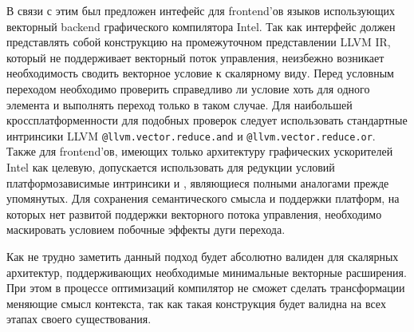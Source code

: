 В связи с этим был предложен интефейс для frontend'ов языков использующих
векторный backend графического компилятора Intel. Так как интерфейс должен
представлять собой конструкцию на промежуточном
представлении LLVM IR, который не поддерживает векторный поток управления,
неизбежно возникает необходимость сводить векторное условие к скалярному виду.
Перед условным переходом необходимо проверить справедливо ли условие хоть для
одного элемента и выполнять переход только в таком случае. Для наибольшей
кроссплатформенности для подобных проверок следует использовать стандартные
интринсики LLVM \texttt{@llvm.vector.reduce.and} и
\texttt{@llvm.vector.reduce.or}. Также для frontend'ов, имеющих только
архитектуру графических ускорителей Intel как
целевую, допускается использовать для редукции условий платформозависимые
интринсики  и , являющиеся полными
аналогами прежде упомянутых. Для сохранения семантического смысла и
поддержки платформ, на которых нет развитой поддержки векторного потока
управления, необходимо маскировать условием побочные эффекты дуги перехода.

Как не трудно заметить данный подход будет абсолютно валиден для
скалярных архитектур, поддерживающих необходимые минимальные векторные
расширения. При этом в процессе оптимизаций компилятор не сможет сделать
трансформации меняющие смысл контекста, так как такая конструкция будет валидна
на всех этапах своего существования.
